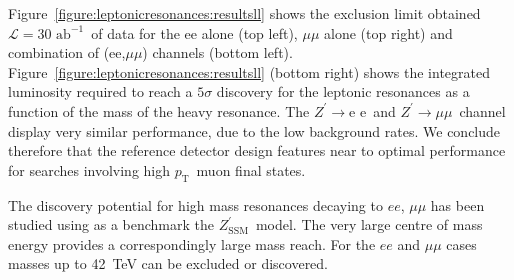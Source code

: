 \documentclass[a4paper,11pt]{article}
\newcommand{\ZpSSM}{\ensuremath{Z^{\prime}_{\mathrm{SSM}}}}
\newcommand*{\Zpee}{\ensuremath{Z^{\prime}\rightarrow \text{e e}}}
\newcommand*{\Zpmumu}{\ensuremath{Z^{\prime}\rightarrow \mu\mu}}
\newcommand{\pt}{\ensuremath{p_{\text{T}}}}
\newcommand*{\intlumifcc}{\ensuremath{\mathcal{L}=30\text{ ab}^{-1}}}
\begin{document}
Figure~\ref{figure:leptonicresonances:resultsll} shows the exclusion limit obtained \intlumifcc\ of data for the ee alone (top left), $\mu\mu$ alone (top right) and combination of (ee,$\mu\mu$) channels (bottom left). Figure~\ref{figure:leptonicresonances:resultsll} (bottom right) shows the integrated luminosity required to reach a $5\sigma$ discovery for the leptonic resonances as a function of the mass of the heavy resonance. The \Zpee\ and \Zpmumu\ channel display very similar performance, due to the low background rates. We conclude therefore that the reference detector design features near to optimal performance for searches involving high \pt\ muon final states.

The discovery potential for high mass resonances decaying to $ee$, $\mu\mu$ has been studied using as a benchmark the \ZpSSM\ model. The very large centre of mass energy provides a correspondingly large mass reach. For the $ee$ and $\mu\mu$ cases masses up to 42~TeV can be excluded or discovered.
\end{document}
